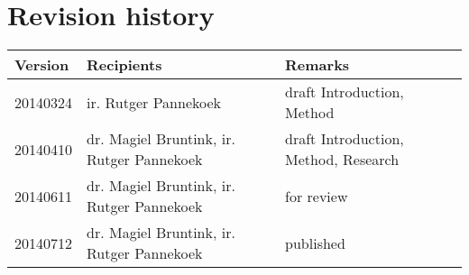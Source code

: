 \chapter*{Revision history}

\begin{tabular}{p{2cm} p{7cm} p{5cm}}
	\hline
	\bfseries{Version}\rm & \bfseries{Recipients}\rm & \bfseries{Remarks}\rm \\
	\hline
	20140324 & ir. Rutger Pannekoek & draft Introduction, Method \\
	20140410 & dr. Magiel Bruntink, ir. Rutger Pannekoek & draft Introduction,
	Method, Research
	\\
	20140611 & dr. Magiel Bruntink, ir. Rutger Pannekoek & for review \\
	20140712 & dr. Magiel Bruntink, ir. Rutger Pannekoek & published \\
	\hline
\end{tabular}
